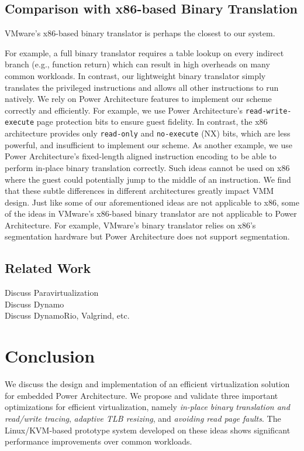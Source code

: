 \documentclass[10pt,twocolumn]{article}
\begin{document}
\subsection{Comparison with x86-based Binary Translation}
VMware's x86-based binary translator\cite{agesen:comparison} is perhaps the closest
to our system.

 For example, a full binary
translator requires a table lookup on every indirect branch (e.g., function return) which
can result in high overheads on many common workloads. In contrast, our lightweight
binary translator simply translates the privileged instructions and allows all other
instructions to run natively.
We rely on Power Architecture features to implement our
scheme correctly and efficiently. For example, we use
Power Architecture's {\tt read-write-execute} page protection bits to ensure guest
fidelity. In contrast, the x86 architecture provides only {\tt read-only} and
{\tt no-execute} (NX) bits, which are less powerful, and insufficient
to implement our scheme. As another
example, we use Power
Architecture's fixed-length aligned instruction encoding to be able to
perform in-place binary translation correctly. Such ideas cannot be used
on x86 where the guest could potentially jump to the middle of an instruction.
We find that these subtle
differences in different architectures greatly impact VMM design. Just like some
of our aforementioned ideas are not applicable to
x86, some of the ideas in VMware's x86-based binary translator
are not applicable to Power Architecture. For example, VMware's binary translator
relies on x86's segmentation hardware but Power Architecture does not
support segmentation.

\subsection{Related Work}
Discuss Paravirtualization\\
Discuss Dynamo\\
Discuss DynamoRio, Valgrind, etc.\\
\section{Conclusion}
We discuss the design and implementation of an efficient virtualization solution
for embedded Power Architecture. We propose and validate three important optimizations
for efficient virtualization, namely {\em in-place binary translation and read/write
tracing}, {\em adaptive TLB resizing}, and {\em avoiding read page faults}. 
The Linux/KVM-based prototype system developed on these ideas shows significant
performance improvements over common workloads.


\end{document}
